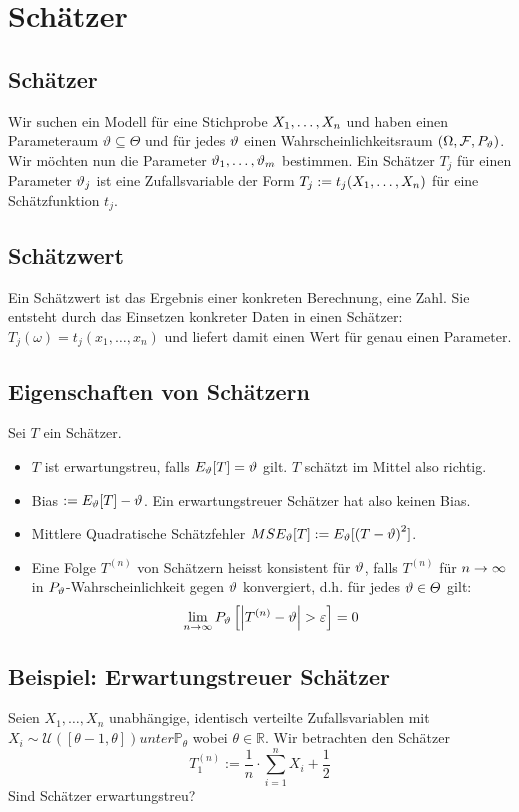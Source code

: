 
{\section{Schätzer}}
\subsection*{Schätzer}
Wir suchen ein Modell für eine Stichprobe $X_1, \dots, X_n$ und haben einen
Parameteraum $\vartheta \subseteq \varTheta$ und für jedes $\vartheta$ einen
Wahrscheinlichkeitsraum $ (\Omega, \mathcal{F}, P_\vartheta)$. Wir möchten nun die Parameter
$\vartheta_1, \dots, \vartheta_m$ bestimmen. Ein Schätzer $T_j$ für einen Parameter $\vartheta_j$
ist eine Zufallsvariable der Form $T_j := t_j (X_1, \dots, X_n)$ für eine
Schätzfunktion $t_j$.
\subsection*{Schätzwert}
Ein Schätzwert ist das Ergebnis einer konkreten Berechnung, eine Zahl. Sie
entsteht durch das Einsetzen konkreter Daten in einen Schätzer: $T_j (\omega) =
  t_j (x_1, \dots, x_n)$ und liefert damit einen Wert für genau einen Parameter.
\subsection*{Eigenschaften von Schätzern}
Sei $T$ ein Schätzer.
\begin{itemize}
  \item $T$ ist erwartungstreu, falls $E_\vartheta[T] = \vartheta$ gilt. $T$ schätzt
        im Mittel also richtig.
  \item Bias $:= E_\vartheta[T] - \vartheta$. Ein erwartungstreuer Schätzer hat also keinen Bias.
  \item Mittlere Quadratische Schätzfehler $MSE_\vartheta[T] := E_\vartheta[ {(T - \vartheta)}^2]$.
  \item Eine Folge $T^{ (n)}$ von Schätzern heisst konsistent für $\vartheta$, falls $T^{
              (n)}$ für $n \rightarrow \infty$ in $P_\vartheta$-Wahrscheinlichkeit gegen $\vartheta$ konvergiert,
        d.h. für jedes $\vartheta \in \varTheta$ gilt:
        \begin{align*}
          \lim_{n \rightarrow \infty} P_\vartheta \left[ \abs{T^{ (n)} - \vartheta} > \varepsilon \right] = 0
        \end{align*}
\end{itemize}
\BoxStart{}
\subsection*{Beispiel: Erwartungstreuer Schätzer}
Seien $X_1, \ldots, X_n$ unabhängige, identisch verteilte Zufallsvariablen mit $X_i \sim \mathcal{U}([\theta - 1, \theta]) unter \mathbb{P}_\theta$ 
wobei $\theta \in \mathbb{R}$. Wir betrachten den Schätzer 
\[T_1^{(n)} := \frac{1}{n} \cdot \sum_{i = 1}^n X_i + \frac{1}{2}\]
Sind Schätzer erwartungstreu?

